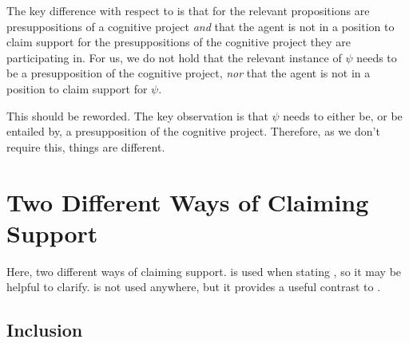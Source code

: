 \begin{note}
  The key difference with respect to \citeauthor{Wright:2016wl} is that for \citeauthor{Wright:2016wl} the relevant propositions are presuppositions of a cognitive project \emph{and} that the agent is not in a position to claim support for the presuppositions of the cognitive project they are participating in.
  For us, we do not hold that the relevant instance of \(\psi\) needs to be a presupposition of the cognitive project, \emph{nor} that the agent is not in a position to claim support for \(\psi\).

  {
    \color{red}
    This should be reworded.
    The key observation is that \(\psi\) needs to either be, or be entailed by, a presupposition of the cognitive project.
    Therefore, as we don't require this, things are different.
  }
\end{note}

\section{Two Different Ways of Claiming Support}
\label{sec:two-different-ways}

\begin{note}
  Here, two different ways of claiming support.
  \RBV{-} is used when stating \nI{}, so it may be helpful to clarify.
  \incl{} is not used anywhere, but it provides a useful contrast to \RBV{}.
\end{note}

\subsection{Inclusion}
\label{sec:inclusion-support}

